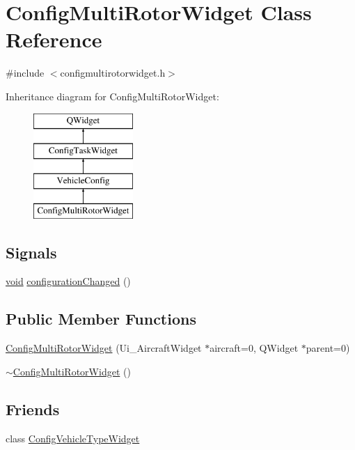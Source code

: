 \hypertarget{class_config_multi_rotor_widget}{\section{Config\-Multi\-Rotor\-Widget Class Reference}
\label{class_config_multi_rotor_widget}
}


{\ttfamily \#include $<$configmultirotorwidget.\-h$>$}

Inheritance diagram for Config\-Multi\-Rotor\-Widget\-:\begin{figure}[H]
\begin{center}
\leavevmode
\includegraphics[height=4.000000cm]{class_config_multi_rotor_widget}
\end{center}
\end{figure}
\subsection*{Signals}
\begin{DoxyCompactItemize}
\item 
\hyperlink{group___u_a_v_objects_plugin_ga444cf2ff3f0ecbe028adce838d373f5c}{void} \hyperlink{group___config_plugin_ga716e8f2fab4b0afb5b3c2df16b199259}{configuration\-Changed} ()
\end{DoxyCompactItemize}
\subsection*{Public Member Functions}
\begin{DoxyCompactItemize}
\item 
\hyperlink{group___config_plugin_ga1f8b823890ddd40ac391df9aa59cfd79}{Config\-Multi\-Rotor\-Widget} (Ui\-\_\-\-Aircraft\-Widget $\ast$aircraft=0, Q\-Widget $\ast$parent=0)
\item 
\hyperlink{group___config_plugin_gac8ee6c628cb4f8f195395978f8f086bb}{$\sim$\-Config\-Multi\-Rotor\-Widget} ()
\end{DoxyCompactItemize}
\subsection*{Friends}
\begin{DoxyCompactItemize}
\item 
class \hyperlink{group___config_plugin_gaf1f904d5df6619518f3228b2d5d238d0}{Config\-Vehicle\-Type\-Widget}
\end{DoxyCompactItemize}
